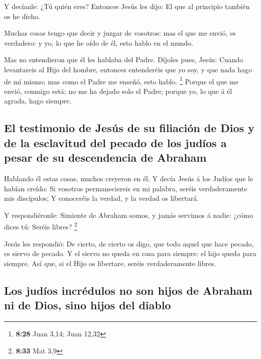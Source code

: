  Y decíanle: ¿Tú quién eres? Entonces Jesús les dijo: El
que al principio también os he dicho.

 Muchas cosas tengo que decir y juzgar de vosotros: mas
el que me envió, es verdadero: y yo, lo que he oído de él, esto hablo en
el mundo.

 Mas no entendieron que él les hablaba del Padre.
 Díjoles pues, Jesús: Cuando levantareis al Hijo del
hombre, entonces entenderéis que yo soy, y que nada hago de mí mismo;
mas como el Padre me enseñó, esto hablo. \footnote{\textbf{8:28} Juan
  3,14; Juan 12,32}  Porque el que me envió, conmigo
está; no me ha dejado solo el Padre; porque yo, lo que á él agrada, hago
siempre.

\hypertarget{el-testimonio-de-jesuxfas-de-su-filiaciuxf3n-de-dios-y-de-la-esclavitud-del-pecado-de-los-juduxedos-a-pesar-de-su-descendencia-de-abraham}{%
\subsection{El testimonio de Jesús de su filiación de Dios y de la
esclavitud del pecado de los judíos a pesar de su descendencia de
Abraham}\label{el-testimonio-de-jesuxfas-de-su-filiaciuxf3n-de-dios-y-de-la-esclavitud-del-pecado-de-los-juduxedos-a-pesar-de-su-descendencia-de-abraham}}

 Hablando él estas cosas, muchos creyeron en él.
 Y decía Jesús á los Judíos que le habían creído: Si
vosotros permaneciereis en mi palabra, seréis verdaderamente mis
discípulos;  Y conoceréis la verdad, y la verdad os
libertará.

 Y respondiéronle: Simiente de Abraham somos, y jamás
servimos á nadie: ¿cómo dices tú: Seréis libres? \footnote{\textbf{8:33}
  Mat 3,9}

 Jesús les respondió: De cierto, de cierto os digo, que
todo aquel que hace pecado, es siervo de pecado.  Y el
siervo no queda en casa para siempre: el hijo queda para siempre.
 Así que, si el Hijo os libertare, seréis verdaderamente
libres.

\hypertarget{los-juduxedos-incruxe9dulos-no-son-hijos-de-abraham-ni-de-dios-sino-hijos-del-diablo}{%
\subsection{Los judíos incrédulos no son hijos de Abraham ni de Dios,
sino hijos del
diablo}\label{los-juduxedos-incruxe9dulos-no-son-hijos-de-abraham-ni-de-dios-sino-hijos-del-diablo}}

